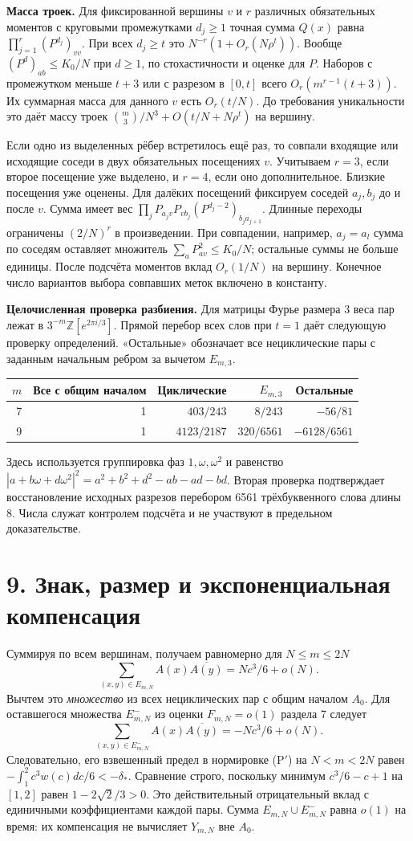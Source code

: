 \documentclass[11pt,a4paper]{article}
\newcommand{\sect}[1]{\section*{\sffamily\color{ink}#1}}
\newcommand{\subt}[1]{\par\medskip\noindent\textbf{#1.}\quad}
\begin{document}
\subt{Масса троек} Для фиксированной вершины $v$ и $r$ различных обязательных моментов с круговыми промежутками $d_j\ge1$ точная сумма $Q(x)$ равна $\prod_{j=1}^r(P^{d_j})_{vv}$. При всех $d_j\ge t$ это $N^{-r}(1+O_r(N\rho^t))$. Вообще $(P^d)_{ab}\le K_0/N$ при $d\ge1$, по стохастичности и оценке для $P$. Наборов с промежутком меньше $t+3$ или с разрезом в $[0,t]$ всего $O_r(m^{r-1}(t+3))$. Их суммарная масса для данного $v$ есть $O_r(t/N)$. До требования уникальности это даёт массу троек $\binom m3/N^3+O(t/N+N\rho^t)$ на вершину.

Если одно из выделенных рёбер встретилось ещё раз, то совпали входящие или исходящие соседи в двух обязательных посещениях $v$. Учитываем $r=3$, если второе посещение уже выделено, и $r=4$, если оно дополнительное. Близкие посещения уже оценены. Для далёких посещений фиксируем соседей $a_j,b_j$ до и после $v$. Сумма имеет вес $\prod_j P_{a_jv}P_{vb_j}(P^{d_j-2})_{b_j a_{j+1}}$. Длинные переходы ограничены $(2/N)^r$ в произведении. При совпадении, например, $a_j=a_l$ сумма по соседям оставляет множитель $\sum_aP_{av}^2\le K_0/N$; остальные суммы не больше единицы. После подсчёта моментов вклад $O_r(1/N)$ на вершину. Конечное число вариантов выбора совпавших меток включено в константу.

\subt{Целочисленная проверка разбиения} Для матрицы Фурье размера 3 веса пар лежат в $3^{-m}\mathbb Z[e^{2\pi i/3}]$. Прямой перебор всех слов при $t=1$ даёт следующую проверку определений. «Остальные» обозначает все нециклические пары с заданным начальным ребром за вычетом $E_{m,3}$.
\begin{center}\small\begin{tabular}{@{}rrrrr@{}}\toprule
$m$ & Все с общим началом & Циклические & $E_{m,3}$ & Остальные \\ \midrule
7 & 1 & $403/243$ & $8/243$ & $-56/81$\\
9 & 1 & $4123/2187$ & $320/6561$ & $-6128/6561$\\ \bottomrule
\end{tabular}\end{center}
Здесь используется группировка фаз $1,\omega,\omega^2$ и равенство $|a+b\omega+d\omega^2|^2=a^2+b^2+d^2-ab-ad-bd$. Вторая проверка подтверждает восстановление исходных разрезов перебором 6561 трёхбуквенного слова длины 8. Числа служат контролем подсчёта и не участвуют в предельном доказательстве.

\newpage
\sect{9. Знак, размер и экспоненциальная компенсация}
Суммируя по всем вершинам, получаем равномерно для $N\le m\le2N$
\[
 \sum_{(x,y)\in E_{m,N}} A(x)\overline{A(y)}
   =N c^3/6+o(N).
\]
Вычтем это \emph{множество} из всех нециклических пар с общим началом $A_0$. Для оставшегося множества $E^-_{m,N}$ из оценки $F_{m,N}=o(1)$ раздела 7 следует
\[
 \boxed{\sum_{(x,y)\in E^-_{m,N}} A(x)\overline{A(y)}
      =-N c^3/6+o(N).}                                                     \tag{13}
\]
Следовательно, его взвешенный предел в нормировке (P$'$) на $N<m<2N$ равен $-\int_1^2 c^3w(c)dc/6<-\delta_*$. Сравнение строго, поскольку минимум $c^3/6-c+1$ на $[1,2]$ равен $1-2\sqrt2/3>0$. Это действительный отрицательный вклад с единичными коэффициентами каждой пары. Сумма $E_{m,N}\cup E^-_{m,N}$ равна $o(1)$ на время: их компенсация не вычисляет $Y_{m,N}$ вне $A_0$.
\end{document}
